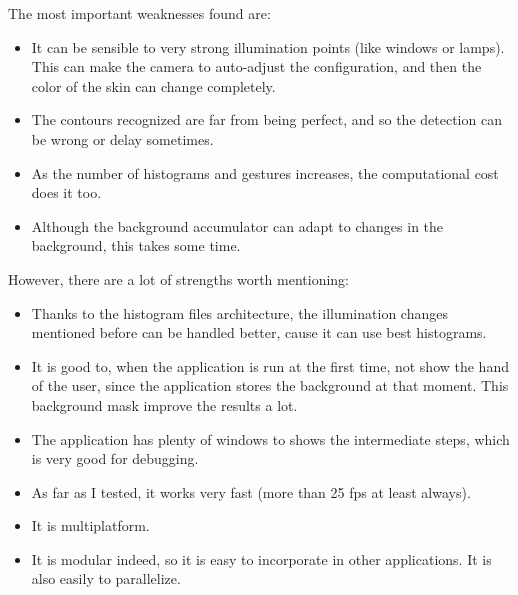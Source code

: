 \documentclass[11pt,a4paper]{article}
\begin{document}
The most important weaknesses found are:

\begin{itemize}
\item It can be sensible to very strong illumination points (like windows or lamps). This can make the camera to auto-adjust the configuration, and then the color of the skin can change completely.
\item The contours recognized are far from being perfect, and so the detection can be wrong or delay sometimes.
\item As the number of histograms and gestures increases, the computational cost does it too.
\item Although the background accumulator can adapt to changes in the background, this takes some time.
\end{itemize}

\newpage
However, there are a lot of strengths worth mentioning:

\begin{itemize}
\item Thanks to the histogram files architecture, the illumination changes mentioned before can be handled better, cause it can use best histograms.
\item It is good to, when the application is run at the first time, not show the hand of the user, since the application stores the background at that moment. This background mask improve the results a lot.
\item The application has plenty of windows to shows the intermediate steps, which is very good for debugging.
\item As far as I tested, it works very fast (more than 25 fps at least always).
\item It is multiplatform.
\item It is modular indeed, so it is easy to incorporate in other applications. It is also easily to parallelize.

\end{itemize}

\end{document}
